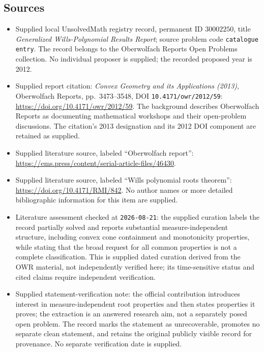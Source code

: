 \documentclass[11pt]{article}
\begin{document}
\subsection{Sources}
\begin{itemize}
\item Supplied local UnsolvedMath registry record, permanent ID \(30002250\), title \emph{Generalized Wills-Polynomial Results Report}; source problem code \texttt{catalogue entry}. The record belongs to the Oberwolfach Reports Open Problems collection. No individual proposer is supplied; the recorded proposed year is 2012.
\item Supplied report citation: \emph{Convex Geometry and its Applications (2013)}, Oberwolfach Reports, pp.~3473--3548, DOI \texttt{10.4171/owr/2012/59}: \url{https://doi.org/10.4171/owr/2012/59}. The background describes Oberwolfach Reports as documenting mathematical workshops and their open-problem discussions. The citation's 2013 designation and its 2012 DOI component are retained as supplied.
\item Supplied literature source, labeled ``Oberwolfach report'': \url{https://ems.press/content/serial-article-files/46430}.
\item Supplied literature source, labeled ``Wills polynomial roots theorem'': \url{https://doi.org/10.4171/RMI/842}. No author names or more detailed bibliographic information for this item are supplied.
\item Literature assessment checked at \texttt{2026-08-21}: the supplied curation labels the record partially solved and reports substantial measure-independent structure, including convex cone containment and monotonicity properties, while stating that the broad request for all common properties is not a complete classification. This is supplied dated curation derived from the OWR material, not independently verified here; its time-sensitive status and cited claims require independent verification.
\item Supplied statement-verification note: the official contribution introduces interest in measure-independent root properties and then states properties it proves; the extraction is an answered research aim, not a separately posed open problem. The record marks the statement as unrecoverable, promotes no separate clean statement, and retains the original publicly visible record for provenance. No separate verification date is supplied.
\end{itemize}
\end{document}
